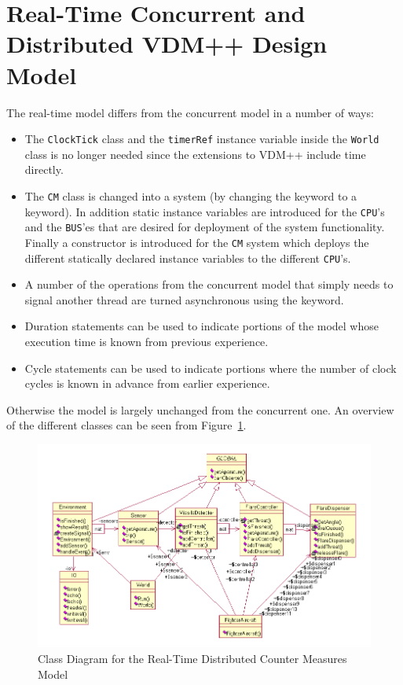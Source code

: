 \documentclass{overturerepchap}
\begin{document}
\section{Real-Time Concurrent and Distributed VDM++ Design Model}\label{sec:realtime}

The real-time model differs from the concurrent model in a number of ways:

\begin{itemize}
\item The \texttt{ClockTick} class and the \texttt{timerRef} instance
  variable inside the \texttt{World} class is no longer needed since
  the extensions to VDM++ include time directly.
\item The \texttt{CM} class is changed into a system (by changing the
{\bf{}} keyword to a {\bf{}} keyword). In addition
static instance variables are introduced for the \texttt{CPU}'s and the
\texttt{BUS}'es that are desired for deployment of the system functionality.
Finally a constructor is introduced for the \texttt{CM} system which deploys
the different statically declared instance variables to the different 
\texttt{CPU}'s.
\item A number of the operations from the concurrent model that simply
  needs to signal another thread are turned asynchronous using the
  {\bf{}} keyword.
\item Duration statements can be used to indicate portions of the model
whose execution time is known from previous experience.
\item Cycle statements can be used to indicate portions where the number 
of clock cycles is known in advance from earlier experience.
\end{itemize}

Otherwise the model is largely unchanged from the concurrent one. An
overview of the different classes can be seen from
Figure~\ref{fig:classdiagvice}.

\begin{figure}
\begin{center}
\includegraphics[width=\textwidth]{figures/viceCMclassdiag.png}
\end{center}
\caption{Class Diagram for the Real-Time Distributed Counter Measures Model\label{fig:classdiagvice}}
\end{figure}
\end{document}
